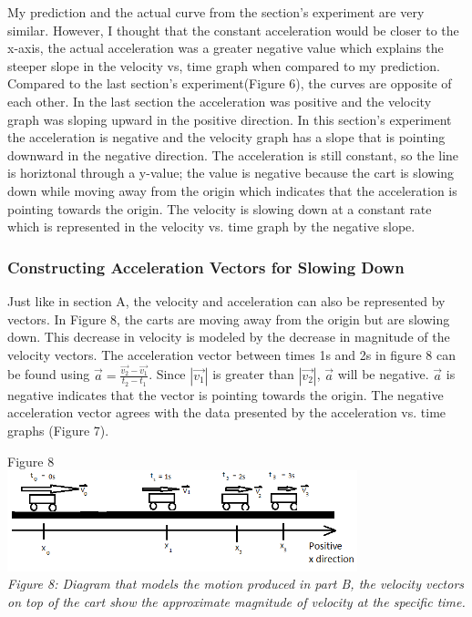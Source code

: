 \documentclass[aps,letterpaper,11pt]{revtex4}
\begin{document}
My prediction and the actual curve from the section's experiment are very similar. However, I thought that the constant acceleration would be closer to the x-axis, the actual acceleration was a greater  negative value which explains the steeper slope in the velocity vs, time graph when compared to my prediction. Compared to the last section's experiment(Figure 6), the curves are opposite of each other. In the last section the acceleration was positive and the velocity graph was sloping upward in the positive direction. In this section's experiment the acceleration is negative and the velocity graph has a slope that is pointing downward in the negative direction. The acceleration is still constant, so the line is horiztonal through a y-value; the value is negative because the cart is slowing down while moving away from the origin which indicates that the acceleration is pointing towards the origin. The velocity is slowing down at a constant rate which is represented in the velocity vs. time graph by the negative slope.

\subsubsection{Constructing Acceleration Vectors for Slowing Down}

Just like in section A, the velocity and acceleration can also be represented by vectors. In Figure 8, the carts are moving away from the origin but are slowing down. This decrease in velocity is modeled by the decrease in magnitude of the velocity vectors. The acceleration vector between times 1s and 2s in figure 8 can be found using $\vec{a} = \frac{\vec{v_2} - \vec{v_1}}{t_2 - t_1}$. Since $|\vec{v_1}|$ is greater than $|\vec{v_2}|$, $\vec{a}$ will be negative. $\vec{a}$ is negative indicates that the vector is pointing towards the origin. The negative acceleration vector agrees with the data presented by the acceleration vs. time graphs (Figure 7). 

\begin{center}
Figure 8\\
\includegraphics[width=4in]{VectorPartB.png}\\
\textit{Figure 8: Diagram that models the motion produced in part B, the velocity vectors on top of the cart show the approximate magnitude of velocity at the specific time.}
\end{center}
\end{document}
